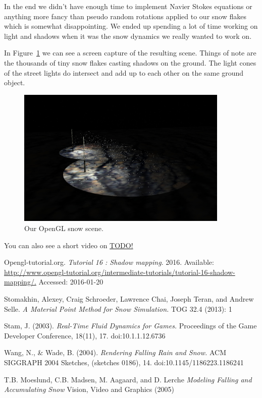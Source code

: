 \documentclass[a4paper,12pt]{article}
\begin{document}
In the end we didn't have enough time to implement Navier Stokes equations or anything more fancy than pseudo random rotations applied to our snow flakes which is somewhat disappointing. We ended up spending a lot of time working on light and shadows when it was the snow dynamics we really wanted to work on.

In Figure~\ref{fig:result} we can see a screen capture of the resulting scene. Things of note are the thousands of tiny snow flakes casting shadows on the ground. The light cones of the street lights do intersect and add up to each other on the same ground object.

\begin{figure}[ht]
  \centering
  \includegraphics[width=0.9\textwidth]{result}
  \caption{\label{fig:result} Our OpenGL snow scene.}
\end{figure}

You can also see a short video on \href{YouTube}{TODO!}

\newpage

\begin{thebibliography}{9}
    Opengl-tutorial.org.
    \emph{Tutorial 16 : Shadow mapping}.
    2016.
    Available: \url{http://www.opengl-tutorial.org/intermediate-tutorials/tutorial-16-shadow-mapping/.}
    Accessed: 2016-01-20

    Stomakhin, Alexey, Craig Schroeder, Lawrence Chai, Joseph Teran, and Andrew Selle.
    \emph{A Material Point Method for Snow Simulation.}
    TOG 32.4 (2013): 1

    Stam, J. (2003).
    \emph{Real-Time Fluid Dynamics for Games.}
    Proceedings of the Game Developer Conference, 18(11), 17. doi:10.1.1.12.6736

    Wang, N., \& Wade, B. (2004).
    \emph{Rendering Falling Rain and Snow.}
    ACM SIGGRAPH 2004 Sketches, (sketches 0186), 14. doi:10.1145/1186223.1186241

    T.B. Moeslund, C.B. Madsen, M. Aagaard, and D. Lerche
    \emph{Modeling Falling and Accumulating Snow}
    Vision, Video and Graphics (2005)

\end{thebibliography}
\end{document}
